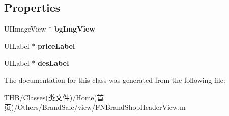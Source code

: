 \subsection*{Properties}
\begin{DoxyCompactItemize}
\item 
\mbox{\label{interface_f_n_brand_shop_coupon_view_a2d161632bbe10476bc7a890b55935889}} 
U\+I\+Image\+View $\ast$ {\bfseries bg\+Img\+View}
\item 
\mbox{\label{interface_f_n_brand_shop_coupon_view_a02a464e23f00643f4eddf19afe3e9e4f}} 
U\+I\+Label $\ast$ {\bfseries price\+Label}
\item 
\mbox{\label{interface_f_n_brand_shop_coupon_view_ab48697da79ba32ac7b8ec962301c747d}} 
U\+I\+Label $\ast$ {\bfseries des\+Label}
\end{DoxyCompactItemize}


The documentation for this class was generated from the following file\+:\begin{DoxyCompactItemize}
\item 
T\+H\+B/\+Classes(类文件)/\+Home(首页)/\+Others/\+Brand\+Sale/view/F\+N\+Brand\+Shop\+Header\+View.\+m\end{DoxyCompactItemize}

